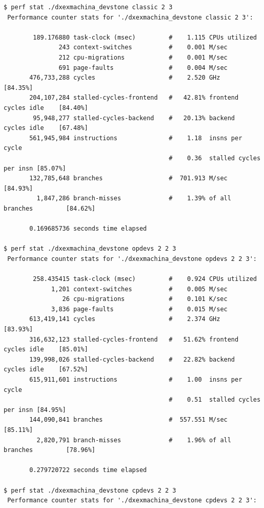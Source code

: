 \documentclass[8pt,a4paper]{report}
\begin{document}
\begin{Verbatim}[fontsize=\small]
$ perf stat ./dxexmachina_devstone classic 2 3
 Performance counter stats for './dxexmachina_devstone classic 2 3':

        189.176880 task-clock (msec)         #    1.115 CPUs utilized          
               243 context-switches          #    0.001 M/sec                  
               212 cpu-migrations            #    0.001 M/sec                  
               691 page-faults               #    0.004 M/sec                  
       476,733,288 cycles                    #    2.520 GHz                     [84.35%]
       204,107,284 stalled-cycles-frontend   #   42.81% frontend cycles idle    [84.40%]
        95,948,277 stalled-cycles-backend    #   20.13% backend  cycles idle    [67.48%]
       561,945,984 instructions              #    1.18  insns per cycle        
                                             #    0.36  stalled cycles per insn [85.07%]
       132,785,648 branches                  #  701.913 M/sec                   [84.93%]
         1,847,286 branch-misses             #    1.39% of all branches         [84.62%]

       0.169685736 seconds time elapsed
       
$ perf stat ./dxexmachina_devstone opdevs 2 2 3
 Performance counter stats for './dxexmachina_devstone opdevs 2 2 3':

        258.435415 task-clock (msec)         #    0.924 CPUs utilized          
             1,201 context-switches          #    0.005 M/sec                  
                26 cpu-migrations            #    0.101 K/sec                  
             3,836 page-faults               #    0.015 M/sec                  
       613,419,141 cycles                    #    2.374 GHz                     [83.93%]
       316,632,123 stalled-cycles-frontend   #   51.62% frontend cycles idle    [85.01%]
       139,998,026 stalled-cycles-backend    #   22.82% backend  cycles idle    [67.52%]
       615,911,601 instructions              #    1.00  insns per cycle        
                                             #    0.51  stalled cycles per insn [84.95%]
       144,090,841 branches                  #  557.551 M/sec                   [85.11%]
         2,820,791 branch-misses             #    1.96% of all branches         [78.96%]

       0.279720722 seconds time elapsed

$ perf stat ./dxexmachina_devstone cpdevs 2 2 3
 Performance counter stats for './dxexmachina_devstone cpdevs 2 2 3':


\end{Verbatim}
\end{document}

